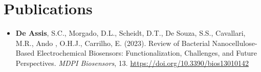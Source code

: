 \documentclass[11pt,a4paper,]{awesome-cv}
\providecommand{\tightlist}{%
	\setlength{\itemsep}{0pt}\setlength{\parskip}{0pt}}
\begin{document}
\hypertarget{publications}{%
\section{Publications}\label{publications}}

\begingroup
\fontsize{10}{12}\selectfont

\begin{itemize}
\tightlist
\item
  \textbf{De Assis}, S.C., Morgado, D.L., Scheidt, D.T., De Souza, S.S.,
  Cavallari, M.R., Ando , O.H.J., Carrilho, E. (2023). Review of
  Bacterial Nanocellulose-Based Electrochemical Biosensors:
  Functionalization, Challenges, and Future Perspectives. \emph{MDPI
  Biosensors}, 13. \url{https://doi.org/10.3390/bios13010142}
\end{itemize}

\endgroup


\label{LastPage}~
\end{document}
